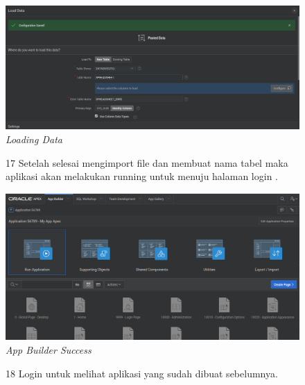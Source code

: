 \begin{enumerate}
\begin{figure}
    \begin{center}
\includegraphics[scale=0.3]{figures/creatSampleData.png}
    \caption{\textit{Loading Data}}
        \end{center}
\label{gambar}
\end{figure}

\begin{figure}
\item[17]Setelah selesai mengimport file dan membuat nama tabel maka aplikasi akan melakukan running untuk menuju halaman login .

    \begin{center}
\includegraphics[scale=0.4]{figures/tampilaApp.png}
    \caption{\textit{App Builder Success}}
        \end{center}
\label{gambar}
\end{figure}

\begin{figure}
\item[18]Login untuk melihat aplikasi yang sudah dibuat sebelumnya.


\end{figure}
\end{enumerate}
